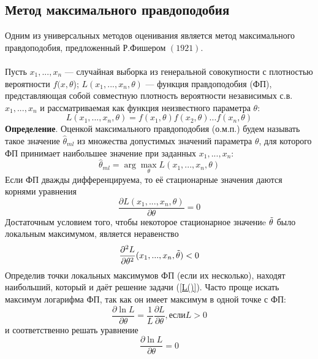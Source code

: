 \documentclass[../body.tex]{subfiles}
\begin{document}
\subsection{Метод максимального правдоподобия}
Одним из универсальных методов оценивания является метод максимального правдоподобия, предложенный Р.Фишером $(1921)$.\\ \\
Пусть $x_{1},...,x_{n}$ — случайная выборка из генеральной совокупности с плотностью вероятности $f(x,\theta$); $L(x_{1},... ,x_{n}, \theta)$ — функция правдоподобия (ФП), представляющая собой совместную плотность вероятности независимых с.в. $x_{1}, ... ,x_{n}$ и рассматриваемая как функция неизвестного параметра $\theta$:
\begin{equation}
	L(x_{1},...,x_{n},\theta) = f(x_{1},\theta)f(x_{2},\theta)...f(x_{n}, \theta)
	\label{L()}
\end{equation}
\textbf{Определение}. Оценкой максимального правдоподобия (о.м.п.) будем называть такое значение $\hat{\theta}_{ml}$ из множества допустимых значений параметра $\theta$, для которого ФП принимает наибольшее значение при заданных $x_{1},...,x_{n}$:
\begin{equation}
	\hat{\theta}_{ml} = \arg \max_{\theta}L(x_{1},...,x_{n},\theta)
	\label{theta_mp}
\end{equation}
Если ФП дважды дифференцируема, то её стационарные значения даются корнями уравнения
\begin{equation}
	\frac{\partial L(x_{1},...,x_{n},\theta)}{\partial \theta} = 0
	\label{eq_min}
\end{equation}
Достаточным условием того, чтобы некоторое стационарное значениe $\Tilde{\theta}$ было локальным максимумом, является неравенство
\begin{equation}
	\frac{\partial^{2}L}{\partial \theta^{2}}(x_{1},...,x_{n},\Tilde{\theta}) < 0
	\label{ineq_min}
\end{equation}
Определив точки локальных максимумов ФП (если их несколько), находят наибольший, который и даёт решение задачи (\ref{L()}).
Часто проще искать максимум логарифма ФП, так как он имеет максимум в одной точке с ФП:
\begin{equation}
	\frac{\partial \ln L}{\partial \theta}=\frac{1}{L}\frac{\partial L}{\partial \theta}, если L > 0
	\label{log_max}
\end{equation}
и соответственно решать уравнение
\begin{equation}
	\frac{\partial \ln L}{\partial \theta}= 0
	\label{log_m=0}
\end{equation}
\end{document}
